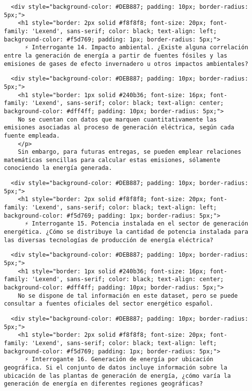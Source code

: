 \documentclass[11pt]{article}
\begin{document}
    \begin{verbatim}
  <div style="background-color: #DEB887; padding: 10px; border-radius: 5px;">
    <h1 style="border: 2px solid #f8f8f8; font-size: 20px; font-family: 'Lexend', sans-serif; color: black; text-align: left; background-color: #f5d769; padding: 1px; border-radius: 5px;">
      ⚡ Interrogante 14. Impacto ambiental. ¿Existe alguna correlación entre la generación de energía a partir de fuentes fósiles y las emisiones de gases de efecto invernadero u otros impactos ambientales?
\end{verbatim}

    \begin{verbatim}
  <div style="background-color: #DEB887; padding: 10px; border-radius: 5px;">
    <h1 style="border: 1px solid #240b36; font-size: 16px; font-family: 'Lexend', sans-serif; color: black; text-align: center; background-color: #dff4ff; padding: 10px; border-radius: 5px;">
    No se cuentan con datos que marquen cuantitativamente las emisiones asociadas al proceso de generación eléctrica, según cada fuente empleada.
    </p>
    Sin embargo, para futuras entregas, se pueden emplear relaciones matemáticas sencillas para calcular estas emisiones, sólamente conociendo la energía generada.
\end{verbatim}

    \begin{verbatim}
  <div style="background-color: #DEB887; padding: 10px; border-radius: 5px;">
    <h1 style="border: 2px solid #f8f8f8; font-size: 20px; font-family: 'Lexend', sans-serif; color: black; text-align: left; background-color: #f5d769; padding: 1px; border-radius: 5px;">
      ⚡ Interrogante 15. Potencia instalada en el sector de generación energética. ¿Cómo se distribuye la cantidad de potencia instalada para las diversas tecnologías de producción de energía eléctrica?
\end{verbatim}

    \begin{verbatim}
  <div style="background-color: #DEB887; padding: 10px; border-radius: 5px;">
    <h1 style="border: 1px solid #240b36; font-size: 16px; font-family: 'Lexend', sans-serif; color: black; text-align: center; background-color: #dff4ff; padding: 10px; border-radius: 5px;">
    No se dispone de tal información en este dataset, pero se puede consultar a fuentes oficiales del sector energético español.
\end{verbatim}

    \begin{verbatim}
  <div style="background-color: #DEB887; padding: 10px; border-radius: 5px;">
    <h1 style="border: 2px solid #f8f8f8; font-size: 20px; font-family: 'Lexend', sans-serif; color: black; text-align: left; background-color: #f5d769; padding: 1px; border-radius: 5px;">
      ⚡ Interrogante 16. Generación de energía por ubicación geográfica. Si el conjunto de datos incluye información sobre la ubicación de las plantas de generación de energía, ¿cómo varía la generación de energía en diferentes regiones geográficas?
\end{verbatim}
\end{document}
